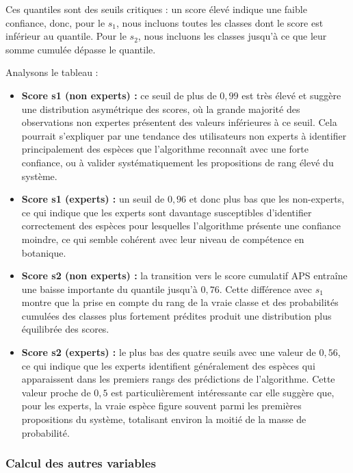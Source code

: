 \documentclass[a4paper,12pt]{article}
\begin{document}
\vspace{0.2cm}

Ces quantiles sont des seuils critiques : un score élevé indique une faible confiance, donc, pour le $s_1$, nous incluons toutes les classes dont le score est inférieur au quantile. Pour le $s_2$, nous incluons les classes jusqu'à ce que leur somme cumulée dépasse le quantile.

\vspace{0.2cm}

Analysons le tableau : 

\begin{itemize}
    \item \textbf{Score s1 (non experts) :} ce seuil de plus de $0,99$ est très élevé et suggère une distribution asymétrique des scores, où la grande majorité des observations non expertes présentent des valeurs inférieures à ce seuil. Cela pourrait s'expliquer par une tendance des utilisateurs non experts à identifier principalement des espèces que l'algorithme reconnaît avec une forte confiance, ou à valider systématiquement les propositions de rang élevé du système.
    \item \textbf{Score s1 (experts) :} un seuil de $0,96$ et donc plus bas que les non-experts, ce qui indique que les experts sont davantage susceptibles d'identifier correctement des espèces pour lesquelles l'algorithme présente une confiance moindre, ce qui semble cohérent avec leur niveau de compétence en botanique.
    \item \textbf{Score s2 (non experts) :} la transition vers le score cumulatif APS entraîne une baisse importante du quantile jusqu'à $0,76$. Cette différence avec $s_1$ montre que la prise en compte du rang de la vraie classe et des probabilités cumulées des classes plus fortement prédites produit une distribution plus équilibrée des scores.
    \item \textbf{Score s2 (experts) :} le plus bas des quatre seuils avec une valeur de $0,56$, ce qui indique que les experts identifient généralement des espèces qui apparaissent dans les premiers rangs des prédictions de l'algorithme. Cette valeur proche de $0,5$ est particulièrement intéressante car elle suggère que, pour les experts, la vraie espèce figure souvent parmi les premières propositions du système, totalisant environ la moitié de la masse de probabilité.
\end{itemize}

\subsubsection{Calcul des autres variables}
\end{document}
